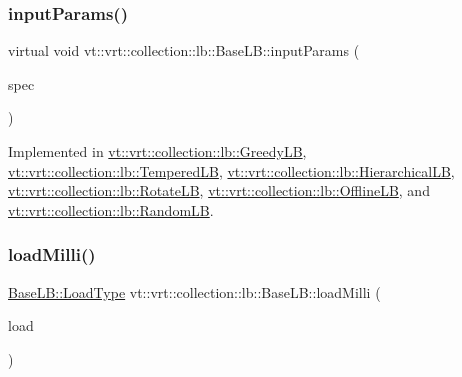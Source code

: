 \subsubsection{\texorpdfstring{input\+Params()}{inputParams()}}
{\footnotesize\ttfamily virtual void vt\+::vrt\+::collection\+::lb\+::\+Base\+L\+B\+::input\+Params (\begin{DoxyParamCaption}\item[{\hyperlink{structvt_1_1vrt_1_1collection_1_1balance_1_1_spec_entry}{balance\+::\+Spec\+Entry} $\ast$}]{spec }\end{DoxyParamCaption})\hspace{0.3cm}{\ttfamily [pure virtual]}}



Implemented in \hyperlink{structvt_1_1vrt_1_1collection_1_1lb_1_1_greedy_l_b_aec90a76fdcb1d57c9edfb6403bcc5181}{vt\+::vrt\+::collection\+::lb\+::\+Greedy\+LB}, \hyperlink{structvt_1_1vrt_1_1collection_1_1lb_1_1_tempered_l_b_a12430d0bfd997324ac4343d736d0572e}{vt\+::vrt\+::collection\+::lb\+::\+Tempered\+LB}, \hyperlink{structvt_1_1vrt_1_1collection_1_1lb_1_1_hierarchical_l_b_a5648ef8b00795a3ecfb2e07a4ee44345}{vt\+::vrt\+::collection\+::lb\+::\+Hierarchical\+LB}, \hyperlink{structvt_1_1vrt_1_1collection_1_1lb_1_1_rotate_l_b_a70fc0a77f387632fc57805950b63f443}{vt\+::vrt\+::collection\+::lb\+::\+Rotate\+LB}, \hyperlink{structvt_1_1vrt_1_1collection_1_1lb_1_1_offline_l_b_a7d6ed6d7ec92fb86187715abacde2824}{vt\+::vrt\+::collection\+::lb\+::\+Offline\+LB}, and \hyperlink{structvt_1_1vrt_1_1collection_1_1lb_1_1_random_l_b_ae0269a00daa9a3111742d9ea35f5a542}{vt\+::vrt\+::collection\+::lb\+::\+Random\+LB}.

\mbox{\label{structvt_1_1vrt_1_1collection_1_1lb_1_1_base_l_b_aadd797eb44f0372e4054e8b3c1ff7ee7}} 
\subsubsection{\texorpdfstring{load\+Milli()}{loadMilli()}}
{\footnotesize\ttfamily \hyperlink{structvt_1_1vrt_1_1collection_1_1lb_1_1_base_l_b_a215e22b9f12678303f49615ae3be05cc}{Base\+L\+B\+::\+Load\+Type} vt\+::vrt\+::collection\+::lb\+::\+Base\+L\+B\+::load\+Milli (\begin{DoxyParamCaption}\item[{\hyperlink{structvt_1_1vrt_1_1collection_1_1lb_1_1_base_l_b_a215e22b9f12678303f49615ae3be05cc}{Load\+Type} const \&}]{load }\end{DoxyParamCaption})\hspace{0.3cm}{\ttfamily [static]}}

